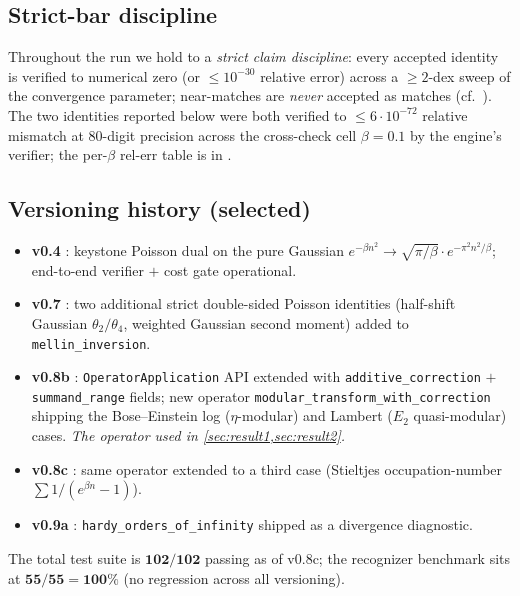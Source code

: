 \documentclass[11pt,reqno]{amsart}
\theoremstyle{definition}
\begin{document}
\subsection{Strict-bar discipline}\label{sec:strictbar}

Throughout the run we hold to a \emph{strict claim discipline}:
every accepted identity is verified to numerical zero (or
$\le 10^{-30}$ relative error) across a $\ge 2$-dex sweep of the
convergence parameter; near-matches are \emph{never} accepted as
matches (cf.\ \cite[CLAUDE.md gotcha~6]{ProjectC}). The two
identities reported below were both verified to
$\le 6 \cdot 10^{-72}$ relative mismatch at $80$-digit precision
across the cross-check cell $\beta = 0.1$ by the engine's verifier;
the per-$\beta$ rel-err table is in
\cite[diary~43]{ProjectC}.

\subsection{Versioning history (selected)}\label{sec:versioning}

\begin{itemize}
\item \textbf{v0.4} \cite[diary~14b]{ProjectC}: keystone Poisson dual
  on the pure Gaussian
  $e^{-\beta n^2} \to \sqrt{\pi/\beta} \cdot e^{-\pi^2 n^2/\beta}$;
  end-to-end verifier $+$ cost gate operational.
\item \textbf{v0.7} \cite[diary~26]{ProjectC}: two additional strict
  double-sided Poisson identities (half-shift Gaussian
  $\theta_2/\theta_4$, weighted Gaussian second moment) added to
  \verb|mellin_inversion|.
\item \textbf{v0.8b} \cite[diary~31]{ProjectC}:
  \verb|OperatorApplication| API extended with
  \verb|additive_correction| $+$ \verb|summand_range| fields; new
  operator \verb|modular_transform_with_correction| shipping the
  Bose--Einstein log ($\eta$-modular) and Lambert ($E_2$
  quasi-modular) cases. \emph{The operator used in
  \cref{sec:result1,sec:result2}.}
\item \textbf{v0.8c} \cite[diary~32]{ProjectC}: same operator extended
  to a third case (Stieltjes occupation-number
  $\sum 1/(e^{\beta n} - 1)$).
\item \textbf{v0.9a} \cite[diary~33]{ProjectC}:
  \verb|hardy_orders_of_infinity| shipped as a divergence diagnostic.
\end{itemize}

The total test suite is $\mathbf{102/102}$ passing as of v0.8c; the
recognizer benchmark sits at $\mathbf{55/55} = \mathbf{100\%}$ (no
regression across all versioning).
\end{document}
